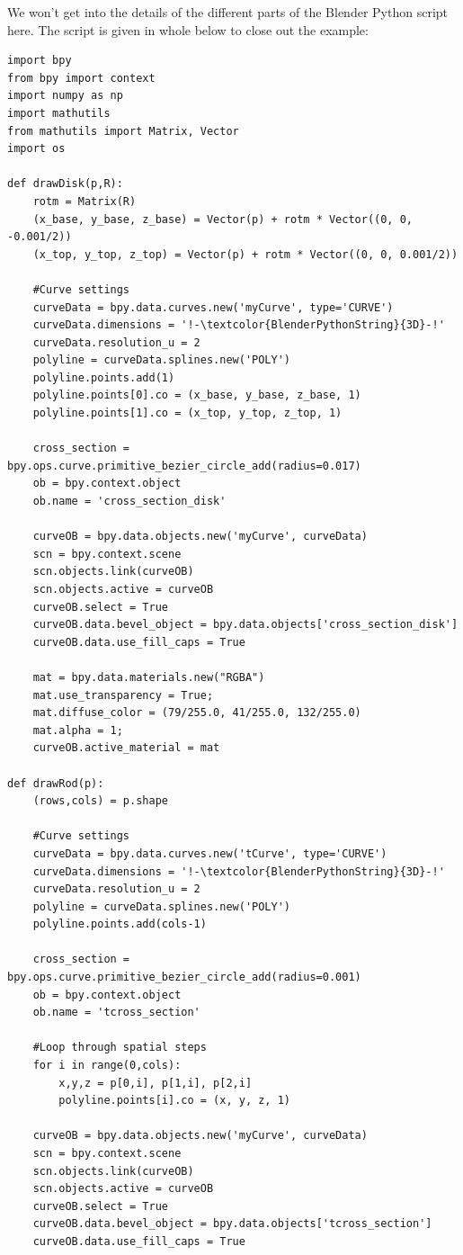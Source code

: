 \documentclass[12pt]{article}
\begin{document}
We won't get into the details of the different parts of the Blender Python script here. The script is given in whole below to close out the example:
\begin{lstlisting}
import bpy
from bpy import context
import numpy as np
import mathutils
from mathutils import Matrix, Vector
import os

def drawDisk(p,R):
    rotm = Matrix(R)
    (x_base, y_base, z_base) = Vector(p) + rotm * Vector((0, 0, -0.001/2))
    (x_top, y_top, z_top) = Vector(p) + rotm * Vector((0, 0, 0.001/2))
    	
    #Curve settings
    curveData = bpy.data.curves.new('myCurve', type='CURVE')
    curveData.dimensions = '!-\textcolor{BlenderPythonString}{3D}-!'
    curveData.resolution_u = 2
    polyline = curveData.splines.new('POLY')
    polyline.points.add(1)
    polyline.points[0].co = (x_base, y_base, z_base, 1)
    polyline.points[1].co = (x_top, y_top, z_top, 1)

    cross_section = bpy.ops.curve.primitive_bezier_circle_add(radius=0.017)
    ob = bpy.context.object
    ob.name = 'cross_section_disk'

    curveOB = bpy.data.objects.new('myCurve', curveData)
    scn = bpy.context.scene
    scn.objects.link(curveOB)
    scn.objects.active = curveOB
    curveOB.select = True
    curveOB.data.bevel_object = bpy.data.objects['cross_section_disk']
    curveOB.data.use_fill_caps = True
    
    mat = bpy.data.materials.new("RGBA")
    mat.use_transparency = True;
    mat.diffuse_color = (79/255.0, 41/255.0, 132/255.0)
    mat.alpha = 1;
    curveOB.active_material = mat

def drawRod(p):
    (rows,cols) = p.shape

    #Curve settings
    curveData = bpy.data.curves.new('tCurve', type='CURVE')
    curveData.dimensions = '!-\textcolor{BlenderPythonString}{3D}-!'
    curveData.resolution_u = 2
    polyline = curveData.splines.new('POLY')
    polyline.points.add(cols-1)
        
    cross_section = bpy.ops.curve.primitive_bezier_circle_add(radius=0.001)
    ob = bpy.context.object
    ob.name = 'tcross_section'

    #Loop through spatial steps
    for i in range(0,cols):
    	x,y,z = p[0,i], p[1,i], p[2,i]
    	polyline.points[i].co = (x, y, z, 1)
            
    curveOB = bpy.data.objects.new('myCurve', curveData)
    scn = bpy.context.scene
    scn.objects.link(curveOB)
    scn.objects.active = curveOB
    curveOB.select = True
    curveOB.data.bevel_object = bpy.data.objects['tcross_section']
    curveOB.data.use_fill_caps = True
    

\end{lstlisting}
\end{document}
